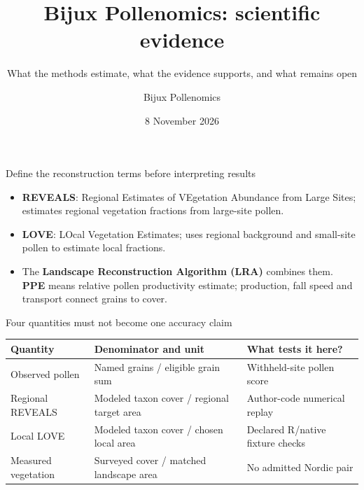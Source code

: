 
\usepackage{pgfplots}
\pgfplotsset{compat=1.18}
\title{Bijux Pollenomics: scientific evidence}
\subtitle{What the methods estimate, what the evidence supports, and what remains open}
\author{Bijux Pollenomics}
\date{8 November 2026}

\frame{\titlepage}

\begin{frame}{Define the reconstruction terms before interpreting results}
\begin{itemize}
\item \textbf{REVEALS}: Regional Estimates of VEgetation Abundance from Large Sites; estimates regional vegetation fractions from large-site pollen.
\item \textbf{LOVE}: LOcal Vegetation Estimates; uses regional background and small-site pollen to estimate local fractions.
\item The \textbf{Landscape Reconstruction Algorithm (LRA)} combines them. \textbf{PPE} means relative pollen productivity estimate; production, fall speed and transport connect grains to cover.
\end{itemize}
\end{frame}

\begin{frame}{Four quantities must not become one accuracy claim}
\small
\begin{tabular}{p{}p{}p{}}
\toprule
Quantity & Denominator and unit & What tests it here? \\
\midrule
Observed pollen & Named grains / eligible grain sum & Withheld-site pollen score \\
Regional REVEALS & Modeled taxon cover / regional target area & Author-code numerical replay \\
Local LOVE & Modeled taxon cover / chosen local area & Declared R/native fixture checks \\
Measured vegetation & Surveyed cover / matched landscape area & No admitted Nordic pair \\
\bottomrule
\end{tabular}
\end{frame}

